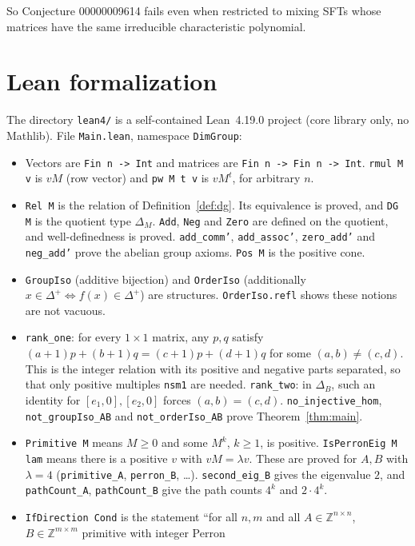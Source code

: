 \documentclass[11pt]{article}
\theoremstyle{definition}
\theoremstyle{remark}
\newcommand{\Z}{\mathbb{Z}}
\begin{document}
So Conjecture 00000009614 fails even when restricted to mixing SFTs whose matrices
have the same irreducible characteristic polynomial.

\section{Lean formalization}
The directory \texttt{lean4/} is a self-contained Lean~4.19.0 project (core library
only, no Mathlib). File \texttt{Main.lean}, namespace \texttt{DimGroup}:
\begin{itemize}
\item Vectors are \texttt{Fin n -> Int} and matrices are \texttt{Fin n -> Fin n -> Int}.
\texttt{rmul M v} is $vM$ (row vector) and \texttt{pw M t v} is $vM^t$, for
arbitrary $n$.
\item \texttt{Rel M} is the relation of Definition~\ref{def:dg}. Its equivalence is
proved, and \texttt{DG M} is the quotient type $\Delta_M$. \texttt{Add},
\texttt{Neg} and \texttt{Zero} are defined on the quotient, and well-definedness is
proved. \texttt{add\_comm'}, \texttt{add\_assoc'}, \texttt{zero\_add'} and
\texttt{neg\_add'} prove the abelian group axioms. \texttt{Pos M} is the positive
cone.
\item \texttt{GroupIso} (additive bijection) and \texttt{OrderIso} (additionally
$x\in\Delta^+\iff f(x)\in\Delta^+$) are structures. \texttt{OrderIso.refl} shows
these notions are not vacuous.
\item \texttt{rank\_one}: for every $1\times1$ matrix, any $p,q$ satisfy
$(a+1)p+(b+1)q=(c+1)p+(d+1)q$ for some $(a,b)\ne(c,d)$. This is the integer
relation with its positive and negative parts separated, so that only positive
multiples \texttt{nsm1} are needed. \texttt{rank\_two}: in $\Delta_B$, such an
identity for $[e_1,0],[e_2,0]$ forces $(a,b)=(c,d)$.
\texttt{no\_injective\_hom}, \texttt{not\_groupIso\_AB} and
\texttt{not\_orderIso\_AB} prove Theorem~\ref{thm:main}.
\item \texttt{Primitive M} means $M\ge0$ and some $M^k$, $k\ge1$, is positive.
\texttt{IsPerronEig M lam} means there is a positive $v$ with $vM=\lambda v$. These
are proved for $A,B$ with $\lambda=4$ (\texttt{primitive\_A}, \texttt{perron\_B},
\dots). \texttt{second\_eig\_B} gives the eigenvalue $2$, and
\texttt{pathCount\_A}, \texttt{pathCount\_B} give the path counts $4^k$ and
$2\cdot4^k$.
\item \texttt{IfDirection Cond} is the statement ``for all $n,m$ and all
$A\in\Z^{n\times n}$, $B\in\Z^{m\times m}$ primitive with integer Perron

\end{itemize}
\end{document}
